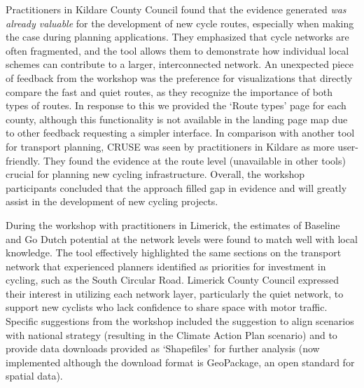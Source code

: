 \documentclass[
  super,
  preprint,
  3p]{elsarticle}
\begin{document}
Practitioners in Kildare County Council found that the evidence
generated \emph{was already valuable} for the development of new cycle
routes, especially when making the case during planning applications.
They emphasized that cycle networks are often fragmented, and the tool
allows them to demonstrate how individual local schemes can contribute
to a larger, interconnected network. An unexpected piece of feedback
from the workshop was the preference for visualizations that directly
compare the fast and quiet routes, as they recognize the importance of
both types of routes. In response to this we provided the `Route types'
page for each county, although this functionality is not available in
the landing page map due to other feedback requesting a simpler
interface. In comparison with another tool for transport planning, CRUSE
was seen by practitioners in Kildare as more user-friendly. They found
the evidence at the route level (unavailable in other tools) crucial for
planning new cycling infrastructure. Overall, the workshop participants
concluded that the approach filled gap in evidence and will greatly
assist in the development of new cycling projects.

During the workshop with practitioners in Limerick, the estimates of
Baseline and Go Dutch potential at the network levels were found to
match well with local knowledge. The tool effectively highlighted the
same sections on the transport network that experienced planners
identified as priorities for investment in cycling, such as the South
Circular Road. Limerick County Council expressed their interest in
utilizing each network layer, particularly the quiet network, to support
new cyclists who lack confidence to share space with motor traffic.
Specific suggestions from the workshop included the suggestion to align
scenarios with national strategy (resulting in the Climate Action Plan
scenario) and to provide data downloads provided as `Shapefiles' for
further analysis (now implemented although the download format is
GeoPackage, an open standard for spatial data).
\end{document}
